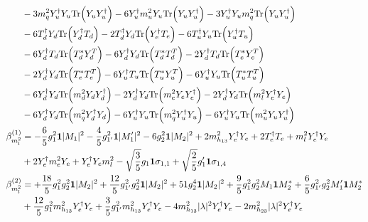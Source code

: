 {\begin{align}
 &-3 {m_q^2  Y_{u}^{\dagger}  Y_u} \mbox{Tr}\Big({Y_u  Y_{u}^{\dagger}}\Big) -6 {Y_{u}^{\dagger}  m_u^2  Y_u} \mbox{Tr}\Big({Y_u  Y_{u}^{\dagger}}\Big) -3 {Y_{u}^{\dagger}  Y_u  m_q^2} \mbox{Tr}\Big({Y_u  Y_{u}^{\dagger}}\Big) \nonumber \\ 
 &-6 {T_{d}^{\dagger}  Y_d} \mbox{Tr}\Big({Y_{d}^{\dagger}  T_d}\Big) -2 {T_{d}^{\dagger}  Y_d} \mbox{Tr}\Big({Y_{e}^{\dagger}  T_e}\Big) -6 {T_{u}^{\dagger}  Y_u} \mbox{Tr}\Big({Y_{u}^{\dagger}  T_u}\Big) \nonumber \\ 
 &-6 {Y_{d}^{\dagger}  T_d} \mbox{Tr}\Big({T_d^*  Y_{d}^{T}}\Big) -6 {Y_{d}^{\dagger}  Y_d} \mbox{Tr}\Big({T_d^*  T_{d}^{T}}\Big) -2 {Y_{d}^{\dagger}  T_d} \mbox{Tr}\Big({T_e^*  Y_{e}^{T}}\Big) \nonumber \\ 
 &-2 {Y_{d}^{\dagger}  Y_d} \mbox{Tr}\Big({T_e^*  T_{e}^{T}}\Big) -6 {Y_{u}^{\dagger}  T_u} \mbox{Tr}\Big({T_u^*  Y_{u}^{T}}\Big) -6 {Y_{u}^{\dagger}  Y_u} \mbox{Tr}\Big({T_u^*  T_{u}^{T}}\Big) \nonumber \\ 
 &-6 {Y_{d}^{\dagger}  Y_d} \mbox{Tr}\Big({m_d^2  Y_d  Y_{d}^{\dagger}}\Big) -2 {Y_{d}^{\dagger}  Y_d} \mbox{Tr}\Big({m_e^2  Y_e  Y_{e}^{\dagger}}\Big) -2 {Y_{d}^{\dagger}  Y_d} \mbox{Tr}\Big({m_l^2  Y_{e}^{\dagger}  Y_e}\Big) \nonumber \\ 
 &-6 {Y_{d}^{\dagger}  Y_d} \mbox{Tr}\Big({m_q^2  Y_{d}^{\dagger}  Y_d}\Big) -6 {Y_{u}^{\dagger}  Y_u} \mbox{Tr}\Big({m_q^2  Y_{u}^{\dagger}  Y_u}\Big) -6 {Y_{u}^{\dagger}  Y_u} \mbox{Tr}\Big({m_u^2  Y_u  Y_{u}^{\dagger}}\Big) \\ 
\beta_{m_l^2}^{(1)} & =  
-\frac{6}{5} g_{1}^{2} {\bf 1} |M_1|^2 -\frac{4}{5} g_{1'}^{2} {\bf 1} |M_1'|^2 -6 g_{2}^{2} {\bf 1} |M_2|^2 +2 m_{h_{13}}^2 {Y_{e}^{\dagger}  Y_e} +2 {T_{e}^{\dagger}  T_e} +{m_l^2  Y_{e}^{\dagger}  Y_e}\nonumber \\ 
 &+2 {Y_{e}^{\dagger}  m_e^2  Y_e} +{Y_{e}^{\dagger}  Y_e  m_l^2}- \sqrt{\frac{3}{5}} g_1 {\bf 1} \sigma_{1,1} +\sqrt{\frac{2}{5}} g_1' {\bf 1} \sigma_{1,4} \\ 
\beta_{m_l^2}^{(2)} & =  
+\frac{18}{5} g_{1}^{2} g_{2}^{2} {\bf 1} |M_2|^2 +\frac{12}{5} g_{1'}^{2} g_{2}^{2} {\bf 1} |M_2|^2 +51 g_{2}^{4} {\bf 1} |M_2|^2 +\frac{9}{5} g_{1}^{2} g_{2}^{2} M_1 {\bf 1} M_2^* +\frac{6}{5} g_{1'}^{2} g_{2}^{2} M_1' {\bf 1} M_2^* \nonumber \\ 
 &+\frac{12}{5} g_{1}^{2} m_{h_{13}}^2 {Y_{e}^{\dagger}  Y_e} +\frac{3}{5} g_{1'}^{2} m_{h_{13}}^2 {Y_{e}^{\dagger}  Y_e} -4 m_{h_{13}}^2 |\lambda|^2 {Y_{e}^{\dagger}  Y_e} -2 m_{h_{23}}^2 |\lambda|^2 {Y_{e}^{\dagger}  Y_e} \nonumber \\ 

\end{align}}

